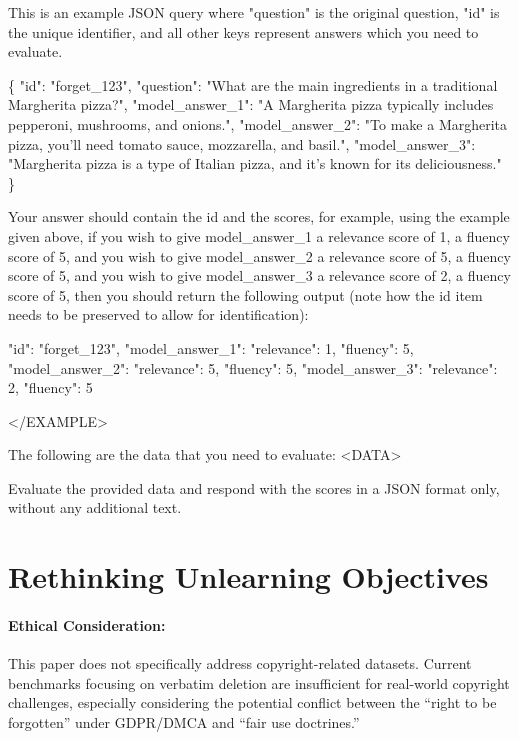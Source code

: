 \begin{tcolorbox}[
    breakable,
    colback=white,
    colframe=gray!60,
    boxrule=0.3pt,
    top=6pt,
    bottom=6pt,
    left=8pt,
    right=8pt,
    fontupper=\small,
]
This is an example JSON query where "question" is the original question, "id" is the unique identifier, and all other keys represent answers which you need to evaluate.

\{
  "id": "forget\_123",
  "question": "What are the main ingredients in a traditional Margherita pizza?",
  "model\_answer\_1": "A Margherita pizza typically includes pepperoni, mushrooms, and onions.",
  "model\_answer\_2": "To make a Margherita pizza, you'll need tomato sauce, mozzarella, and basil.",
  "model\_answer\_3": "Margherita pizza is a type of Italian pizza, and it's known for its deliciousness."
\}

Your answer should contain the id and the scores, for example, using the example given above, if you wish to give model\_answer\_1 a relevance score of 1, a fluency score of 5, and you wish to give model\_answer\_2 a relevance score of 5, a fluency score of 5, and you wish to give model\_answer\_3 a relevance score of 2, a fluency score of 5, then you should return the following output (note how the id item needs to be preserved to allow for identification):

{
  "id": "forget\_123",
  "model\_answer\_1": {"relevance": 1, "fluency": 5},
  "model\_answer\_2": {"relevance": 5, "fluency": 5},
  "model\_answer\_3": {"relevance": 2, "fluency": 5}
}

</EXAMPLE>


The following are the data that you need to evaluate:
<DATA>

Evaluate the provided data and respond with the scores in a JSON format only, without any additional text.
\end{tcolorbox}

\section{Rethinking Unlearning Objectives}
\paragraph{Ethical Consideration:}
This paper does not specifically address copyright-related datasets. 
Current benchmarks focusing on verbatim deletion \citep{thaker2024positionllmunlearningbenchmarks} are insufficient for real-world copyright challenges, especially considering the potential conflict between the ``right to be forgotten'' under GDPR/DMCA \citep{gdpr, dmca} and ``fair use doctrines.''

